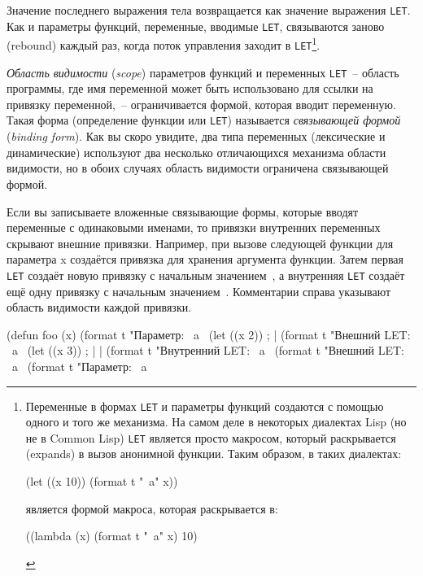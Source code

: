Значение последнего выражения тела возвращается как значение выражения \lstinline{LET}. Как и
параметры функций, переменные, вводимые \lstinline{LET}, связываются заново (rebound) каждый
раз, когда поток управления заходит в \lstinline{LET}\footnote{Переменные в формах \lstinline{LET} и
параметры функций создаются с помощью одного и того же механизма. На самом деле в
некоторых диалектах Lisp (но не в Common Lisp) \lstinline{LET} является просто макросом,
который раскрывается (expands) в вызов анонимной функции. Таким образом, в таких диалектах:

\begin{myverb}
  (let ((x 10)) (format t "~a" x))
\end{myverb}


\noindent{}является формой макроса, которая раскрывается в:

\begin{myverb}
  ((lambda (x) (format t "~a" x) 10)
\end{myverb}
}.

\textit{Область видимости} (\textit{scope}) параметров функций и переменных
\lstinline{LET}~-- область программы, где имя переменной может быть использовано для ссылки
на привязку переменной,~-- ограничивается формой, которая вводит переменную. Такая форма
(определение функции или \lstinline{LET}) называется \textit{связывающей формой}
(\textit{binding form}). Как вы скоро увидите, два типа переменных (лексические и
динамические) используют два несколько отличающихся механизма области видимости, но в
обоих случаях область видимости ограничена связывающей формой.

Если вы записываете вложенные связывающие формы, которые вводят переменные с одинаковыми
именами, то привязки внутренних переменных скрывают внешние привязки. Например, при вызове
следующей функции для параметра x создаётся привязка для хранения аргумента функции. Затем
первая \lstinline{LET} создаёт новую привязку с начальным значением~, а внутренняя
\lstinline{LET} создаёт ещё одну привязку с начальным значением~. Комментарии справа
указывают область видимости каждой привязки.

\begin{myverb}
  (defun foo (x)
    (format t "Параметр: ~a~%
    (let ((x 2))                             ; |
      (format t "Внешний LET: ~a~%
      (let ((x 3))                           ; | |
        (format t "Внутренний LET: ~a~%
      (format t "Внешний LET: ~a~%
    (format t "Параметр: ~a~%
\end{myverb}

